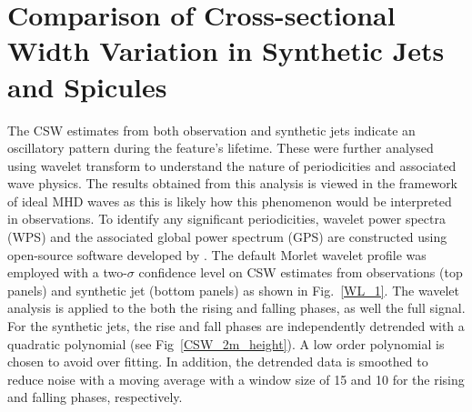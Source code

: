 \documentclass[12pt]{ociamthesis}
\newcommand{\np}{\\ \\}
\begin{document}
\section{Comparison of Cross-sectional Width Variation in Synthetic Jets and Spicules}
\label{sec:CSW_comp}
The CSW estimates from both observation and synthetic jets indicate an oscillatory pattern during the feature’s lifetime. These were further analysed using wavelet transform to understand the nature of periodicities and associated wave physics. The results obtained from this analysis is viewed in the framework of ideal MHD waves as this is likely how this phenomenon would be interpreted in observations. To identify any significant periodicities, wavelet power spectra (WPS) and the associated global power spectrum (GPS) are constructed using open-source software developed by \cite{Torrence1998}. The default Morlet wavelet profile was employed with a two-$\sigma$ confidence level on CSW estimates from observations (top panels) and synthetic jet (bottom panels) as shown in Fig.~\ref{WL_1}. The wavelet analysis is applied to the both the rising and falling phases, as well the full signal. For the synthetic jets, the rise and fall phases are independently detrended with a quadratic polynomial (see Fig~\ref{CSW_2m_height}). A low order polynomial is chosen to avoid over fitting. In addition, the detrended data is smoothed to reduce noise with a moving average with a window size of 15 and 10 for the rising and falling phases, respectively. \np
%
\end{document}
